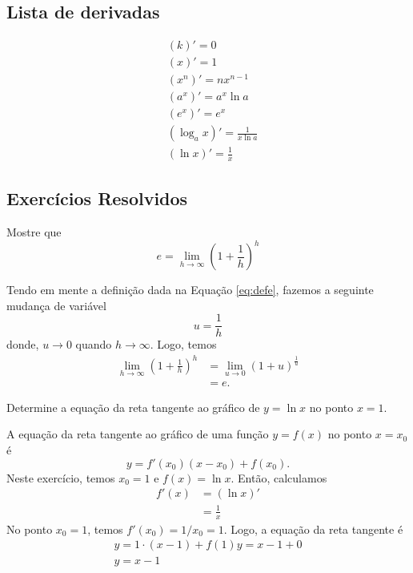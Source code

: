 \subsection{Lista de derivadas}

\begin{align}
  &(k)' = 0\\
  &(x)' = 1\\
  &(x^n)' = nx^{n-1}\\
  &(a^x)' = a^x\ln a\\
  &(e^x)' = e^x\\
  &(\log_a x)' = \frac{1}{x\ln a}\\
  &(\ln x)' = \frac{1}{x}
\end{align}


\subsection*{Exercícios Resolvidos}

\begin{exeresol}
  Mostre que
  \begin{equation}
    e = \lim_{h\to\infty} \left(1 + \frac{1}{h}\right)^h
  \end{equation}
\end{exeresol}
\begin{resol}
  Tendo em mente a definição dada na Equação \ref{eq:defe}, fazemos a seguinte mudança de variável
  \begin{equation}
    u = \frac{1}{h}
  \end{equation}
  donde, $u\to 0$ quando $h\to \infty$. Logo, temos
  \begin{align}
    \lim_{h\to\infty} \left(1 + \frac{1}{h}\right)^h &= \lim_{u\to 0} \left(1 + u\right)^{\frac{1}{u}}\\
                                                     &= e.
  \end{align}
\end{resol}

\begin{exeresol}
  Determine a equação da reta tangente ao gráfico de $y = \ln x$ no ponto $x=1$.
\end{exeresol}
\begin{resol}
  A equação da reta tangente ao gráfico de uma função $y = f(x)$ no ponto $x=x_0$ é
  \begin{equation}
    y = f'(x_0)(x-x_0) + f(x_0).
  \end{equation}
  Neste exercício, temos $x_0=1$ e $f(x) =\ln x$. Então, calculamos
  \begin{align}
    f'(x) &= (\ln x)'\\
          &= \frac{1}{x}
  \end{align}
  No ponto $x_0 = 1$, temos $f'(x_0) = 1/x_0 = 1$. Logo, a equação da reta tangente é
  \begin{gather}
    y = 1\cdot(x - 1) + f(1)
    y = x - 1 + 0\\
    y = x - 1
  \end{gather}
\end{resol}

